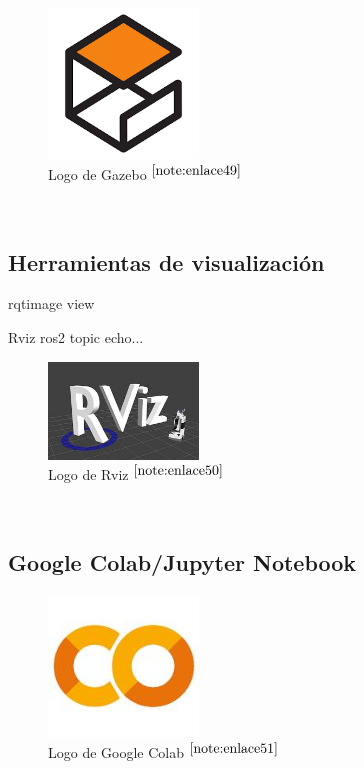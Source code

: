 \begin{figure} [h!]
	\begin{center}
		\includegraphics[width=4cm]{figs/gazebo.png}
	\end{center}
	\caption{Logo de Gazebo $^{\ref{note:enlace49}}$} 
	\label{fig:gazebo}
\end{figure}\

\setcounter{footnote}{49} %

\subsection{Herramientas de visualización}

rqtimage view

Rviz
ros2 topic echo...

\begin{figure} [h!]
	\begin{center}
		\includegraphics[width=4cm]{figs/rviz.png}
	\end{center}
	\caption{Logo de Rviz $^{\ref{note:enlace50}}$} 
	\label{fig:rviz}
\end{figure}\

\setcounter{footnote}{50} %

\subsection{Google Colab/Jupyter Notebook}

\begin{figure} [h!]
	\begin{center}
		\includegraphics[width=4cm]{figs/googlecolab.png}
	\end{center}
	\caption{Logo de Google Colab $^{\ref{note:enlace51}}$} 
	\label{fig:googlecolab}
\end{figure}\


